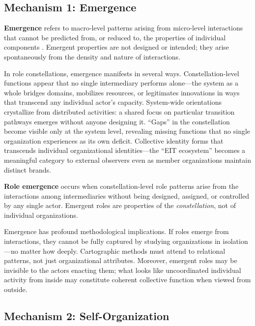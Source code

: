 \documentclass[../main.tex]{subfiles}
\begin{document}
\subsection{Mechanism 1: Emergence}

\textbf{Emergence} refers to macro-level patterns arising from micro-level interactions that cannot be predicted from, or reduced to, the properties of individual components \cite{holland1995hidden}. Emergent properties are not designed or intended; they arise spontaneously from the density and nature of interactions.

In role constellations, emergence manifests in several ways. Constellation-level functions appear that no single intermediary performs alone---the system as a whole bridges domains, mobilizes resources, or legitimates innovations in ways that transcend any individual actor's capacity. System-wide orientations crystallize from distributed activities: a shared focus on particular transition pathways emerges without anyone designing it. ``Gaps'' in the constellation become visible only at the system level, revealing missing functions that no single organization experiences as its own deficit. Collective identity forms that transcends individual organizational identities---the ``EIT ecosystem'' becomes a meaningful category to external observers even as member organizations maintain distinct brands.

\begin{roledef}
\textbf{Role emergence} occurs when constellation-level role patterns arise from the interactions among intermediaries without being designed, assigned, or controlled by any single actor. Emergent roles are properties of the \emph{constellation}, not of individual organizations.
\end{roledef}

Emergence has profound methodological implications. If roles emerge from interactions, they cannot be fully captured by studying organizations in isolation---no matter how deeply. Cartographic methods must attend to relational patterns, not just organizational attributes. Moreover, emergent roles may be invisible to the actors enacting them; what looks like uncoordinated individual activity from inside may constitute coherent collective function when viewed from outside.

\subsection{Mechanism 2: Self-Organization}
\end{document}
